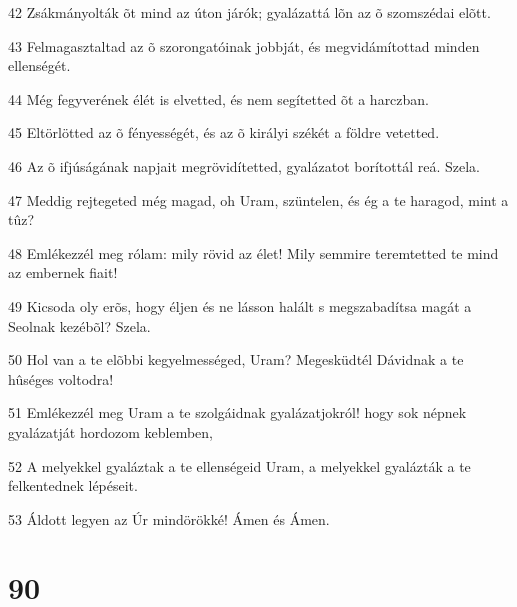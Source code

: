 \par 42 Zsákmányolták õt mind az úton járók; gyalázattá lõn az õ szomszédai elõtt.
\par 43 Felmagasztaltad az õ szorongatóinak jobbját, és megvidámítottad minden ellenségét.
\par 44 Még fegyverének élét is elvetted, és nem segítetted õt a harczban.
\par 45 Eltörlötted az õ fényességét, és az õ királyi székét a földre vetetted.
\par 46 Az õ ifjúságának napjait megrövidítetted, gyalázatot borítottál reá. Szela.
\par 47 Meddig rejtegeted még magad, oh Uram, szüntelen, és ég a te haragod, mint a tûz?
\par 48 Emlékezzél meg rólam: mily rövid az élet! Mily semmire teremtetted te mind az embernek fiait!
\par 49 Kicsoda oly erõs, hogy éljen és ne lásson halált s megszabadítsa magát a Seolnak kezébõl? Szela.
\par 50 Hol van a te elõbbi kegyelmességed, Uram? Megesküdtél Dávidnak a te hûséges voltodra!
\par 51 Emlékezzél meg Uram a te szolgáidnak gyalázatjokról! hogy sok népnek gyalázatját hordozom keblemben,
\par 52 A melyekkel gyaláztak a te ellenségeid Uram, a melyekkel gyalázták a te felkentednek lépéseit.
\par 53 Áldott legyen az Úr mindörökké! Ámen és Ámen.

\chapter{90}

